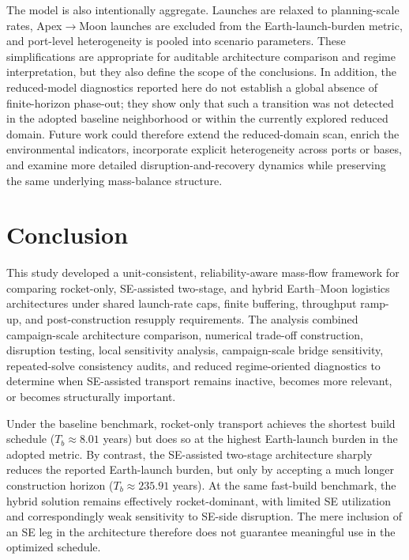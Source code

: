 \documentclass[12pt]{article}
\begin{document}
The model is also intentionally aggregate. Launches are relaxed to planning-scale rates, Apex$\to$Moon launches are excluded from the Earth-launch-burden metric, and port-level heterogeneity is pooled into scenario parameters. These simplifications are appropriate for auditable architecture comparison and regime interpretation, but they also define the scope of the conclusions. In addition, the reduced-model diagnostics reported here do not establish a global absence of finite-horizon phase-out; they show only that such a transition was not detected in the adopted baseline neighborhood or within the currently explored reduced domain. Future work could therefore extend the reduced-domain scan, enrich the environmental indicators, incorporate explicit heterogeneity across ports or bases, and examine more detailed disruption-and-recovery dynamics while preserving the same underlying mass-balance structure.

\section{Conclusion}

This study developed a unit-consistent, reliability-aware mass-flow framework for comparing rocket-only, SE-assisted two-stage, and hybrid Earth--Moon logistics architectures under shared launch-rate caps, finite buffering, throughput ramp-up, and post-construction resupply requirements. The analysis combined campaign-scale architecture comparison, numerical trade-off construction, disruption testing, local sensitivity analysis, campaign-scale bridge sensitivity, repeated-solve consistency audits, and reduced regime-oriented diagnostics to determine when SE-assisted transport remains inactive, becomes more relevant, or becomes structurally important.

Under the baseline benchmark, rocket-only transport achieves the shortest build schedule (\(T_b\approx 8.01\) years) but does so at the highest Earth-launch burden in the adopted metric. By contrast, the SE-assisted two-stage architecture sharply reduces the reported Earth-launch burden, but only by accepting a much longer construction horizon (\(T_b\approx 235.91\) years). At the same fast-build benchmark, the hybrid solution remains effectively rocket-dominant, with limited SE utilization and correspondingly weak sensitivity to SE-side disruption. The mere inclusion of an SE leg in the architecture therefore does not guarantee meaningful use in the optimized schedule.
\end{document}
